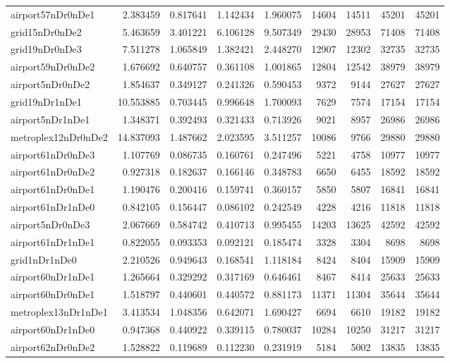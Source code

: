 \begin{longtable}{|l|r|r|r|r|r|r|r|r|}
airport57nDr0nDe1 & 2.383459 & 0.817641 & 1.142434 & 1.960075 & 14604 & 14511 & 45201 & 45201 \\
grid15nDr0nDe2 & 5.463659 & 3.401221 & 6.106128 & 9.507349 & 29430 & 28953 & 71408 & 71408 \\
grid19nDr0nDe3 & 7.511278 & 1.065849 & 1.382421 & 2.448270 & 12907 & 12302 & 32735 & 32735 \\
airport59nDr0nDe2 & 1.676692 & 0.640757 & 0.361108 & 1.001865 & 12804 & 12542 & 38979 & 38979 \\
airport5nDr0nDe2 & 1.854637 & 0.349127 & 0.241326 & 0.590453 & 9372 & 9144 & 27627 & 27627 \\
grid19nDr1nDe1 & 10.553885 & 0.703445 & 0.996648 & 1.700093 & 7629 & 7574 & 17154 & 17154 \\
airport5nDr1nDe1 & 1.348371 & 0.392493 & 0.321433 & 0.713926 & 9021 & 8957 & 26986 & 26986 \\
metroplex12nDr0nDe2 & 14.837093 & 1.487662 & 2.023595 & 3.511257 & 10086 & 9766 & 29880 & 29880 \\
airport61nDr0nDe3 & 1.107769 & 0.086735 & 0.160761 & 0.247496 & 5221 & 4758 & 10977 & 10977 \\
airport61nDr0nDe2 & 0.927318 & 0.182637 & 0.166146 & 0.348783 & 6650 & 6455 & 18592 & 18592 \\
airport61nDr0nDe1 & 1.190476 & 0.200416 & 0.159741 & 0.360157 & 5850 & 5807 & 16841 & 16841 \\
airport61nDr1nDe0 & 0.842105 & 0.156447 & 0.086102 & 0.242549 & 4228 & 4216 & 11818 & 11818 \\
airport5nDr0nDe3 & 2.067669 & 0.584742 & 0.410713 & 0.995455 & 14203 & 13625 & 42592 & 42592 \\
airport61nDr1nDe1 & 0.822055 & 0.093353 & 0.092121 & 0.185474 & 3328 & 3304 & 8698 & 8698 \\
grid1nDr1nDe0 & 2.210526 & 0.949643 & 0.168541 & 1.118184 & 8424 & 8404 & 15909 & 15909 \\
airport60nDr1nDe1 & 1.265664 & 0.329292 & 0.317169 & 0.646461 & 8467 & 8414 & 25633 & 25633 \\
airport60nDr0nDe1 & 1.518797 & 0.440601 & 0.440572 & 0.881173 & 11371 & 11304 & 35644 & 35644 \\
metroplex13nDr1nDe1 & 3.413534 & 1.048356 & 0.642071 & 1.690427 & 6694 & 6610 & 19182 & 19182 \\
airport60nDr1nDe0 & 0.947368 & 0.440922 & 0.339115 & 0.780037 & 10284 & 10250 & 31217 & 31217 \\
airport62nDr0nDe2 & 1.528822 & 0.119689 & 0.112230 & 0.231919 & 5184 & 5002 & 13835 & 13835 \\

\end{longtable}
